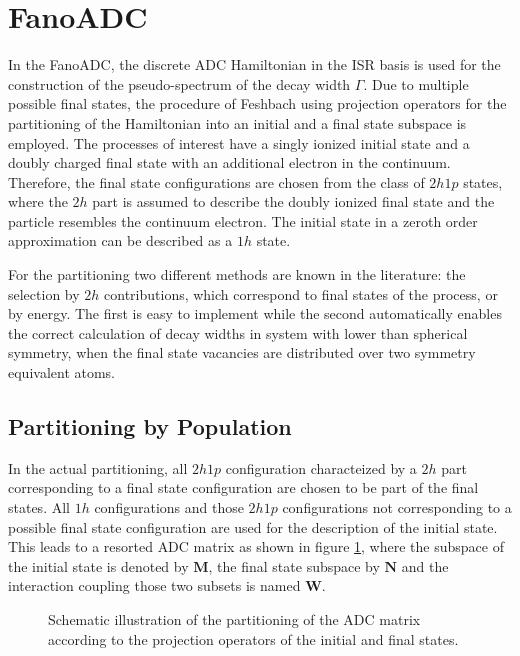 \section{FanoADC}
In the FanoADC, the discrete ADC Hamiltonian in the \ac{ISR}
basis is used for the construction of the pseudo-spectrum of the decay width
$\Gamma$.
Due to multiple possible final states, the procedure
of Feshbach using projection operators for the partitioning of the Hamiltonian
into an initial and a final state subspace is employed.
The processes of interest have a singly ionized initial state and a
doubly charged final state with an additional electron in the continuum.
Therefore, the final state configurations are chosen from
the class of $2h1p$ states, where the $2h$ part is assumed to
describe the doubly ionized final state and the particle resembles the continuum electron.
The initial state in a zeroth order approximation can be described as a $1h$ state.

For the partitioning two different methods are known in the literature:
the selection by $2h$ contributions, which correspond to final states of
the process\cite{Averbukh05}, or by energy\cite{}.
The first is easy to implement while the second automatically
enables the correct calculation of decay widths in system with lower than
spherical symmetry, when the final state vacancies are distributed over two symmetry
equivalent atoms.


\subsection{Partitioning by Population}
In the actual partitioning, all $2h1p$ configuration characteized by a $2h$
part corresponding to
a final state configuration are chosen to be part of the final states.
All $1h$ configurations and those $2h1p$ configurations not corresponding
to a possible final state configuration are used for the description
of the initial state. This leads to a resorted \ac{ADC} matrix as shown in
figure \ref{figure:fano_matsort}, where the subspace of the initial state
is denoted by $\mathbf{M}$, the final state subspace by $\mathbf{N}$ and
the interaction coupling those two subsets is named $\mathbf{W}$.

\begin{figure}[h]
  \centering
  
  \caption{Schematic illustration of the partitioning of the \ac{ADC} matrix
           according to the projection operators of the initial and final
           states.}
  \label{figure:fano_matsort}
\end{figure}

